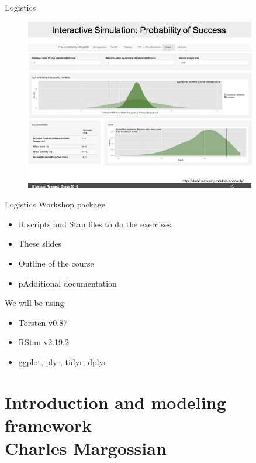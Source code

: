 \documentclass[presentation]{beamer}
\begin{document}
\begin{frame}[label={sec:org22db823}]{Logistics}
\begin{latex}
\begin{figure}
\begin{minipage}{0.3\textwidth}
  \end{minipage}
  \begin{minipage}{0.3\textwidth}
    \centering
    \includegraphics[width=0.9\textwidth]{metworx_decisionmakingtools}
  \end{minipage}
\end{figure}
\end{latex}
\end{frame}

\begin{frame}[label={sec:orgba634fb}]{Logistics}
Workshop package
\begin{itemize}
\item R scripts and Stan files to do the exercises
\item These slides
\item Outline of the course
\item pAdditional documentation
\end{itemize}

We will be using:
\begin{itemize}
\item Torsten v0.87
\item RStan v2.19.2
\item ggplot, plyr, tidyr, dplyr
\end{itemize}
\end{frame}

\section{Introduction and modeling framework \\ \small{Charles Margossian}}
\label{sec:orgb9a4a6e}
\end{document}
